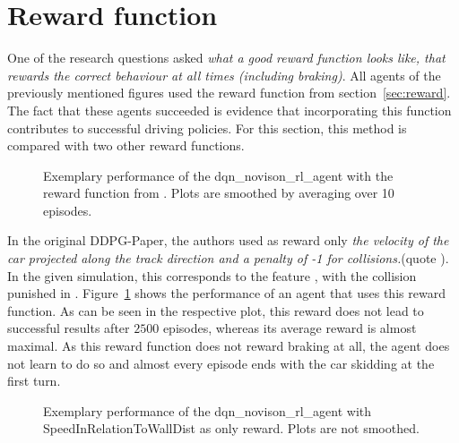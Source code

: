 \section{Reward function}

One of the research questions asked \textit{what a good reward function looks like, that rewards the \textit{correct} behaviour at all times (including braking)}. All agents of the previously mentioned figures used the reward function from section~\ref{sec:reward}. The fact that these agents succeeded is evidence that incorporating this function contributes to successful driving policies. For this section, this method is compared with two other reward functions. 

\begin{figure}[h]
	{%
		\setlength{\fboxsep}{0pt}%
		\setlength{\fboxrule}{1pt}%
	}%
	\centering
	\caption[Exemplary performance of the dqn\_novison\_rl\_agent with the reward function from \cite{lillicrap_continuous_2015}]{Exemplary performance of the dqn\_novison\_rl\_agent with the reward function from \cite{lillicrap_continuous_2015}. Plots are smoothed by averaging over 10 episodes.}
	\label{fig:dqnrewardspeedstuff}
\end{figure}

In the original DDPG-Paper, the authors used as reward only \textit{the velocity of the car projected along the track direction and a penalty of -1 for collisions.}(quote \cite{lillicrap_continuous_2015}). In the given simulation, this corresponds to the feature , with the collision punished in . Figure~\ref{fig:dqnrewardspeedstuff} shows the performance of an agent that uses this reward function. 
As can be seen in the respective plot, this reward does not lead to successful results after $2500$ episodes, whereas its average reward is almost maximal. As this reward function does not reward braking at all, the agent does not learn to do so and almost every episode ends with the car skidding at the first turn.

\begin{figure}[h]
	{%
		\setlength{\fboxsep}{0pt}%
		\setlength{\fboxrule}{1pt}%
	}%
	\centering
	\caption[Exemplary performance of the dqn\_novison\_rl\_agent with SpeedInRelationToWallDist as only reward.]{Exemplary performance of the dqn\_novison\_rl\_agent with SpeedInRelationToWallDist as only reward. Plots are not smoothed.}
	\label{fig:dqnrewardinrelationtowall}
\end{figure}

